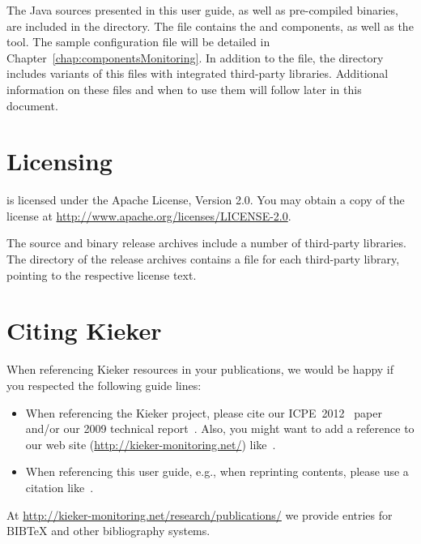 		\noindent
		The Java sources presented in this user guide, as well as pre-compiled binaries, are included in the \file{\exampleDir/} directory. The file \file{\mainJar{}} contains the \KiekerMonitoringPart{} and \KiekerAnalysisPart{} components, as well as the \KiekerTraceAnalysis{} tool. The sample \KiekerMonitoringPart{} configuration file 
		\file{\kiekerMonitoringProperties{}} will be detailed in Chapter~\ref{chap:componentsMonitoring}. In addition to the \file{\mainJar{}} file, the  directory includes variants of this  files with integrated third-party libraries. Additional information on these  files and when to use them will follow later in this document.
		
	\section{Licensing}
		\Kieker{} is licensed under the Apache License, Version 2.0. You may obtain a copy of the license at \url{http://www.apache.org/licenses/LICENSE-2.0}.
		
		The \Kieker{} source and binary release archives include a number of third-party libraries. The  directory of the release archives contains a  file for each third-party library, pointing to the respective license text.	
		
	\section{Citing Kieker}\label{sec:ch1:citingKieker}
		When referencing Kieker resources in your publications, we would be happy if you respected the following guide lines:

		\begin{itemize}
			\item 
			When referencing the Kieker project, please cite our ICPE~2012~\cite{KiekerICPE2012} paper and/or our 2009 technical report~\cite{vanHoornRohrHasselbringWallerEhlersFreyKieselhorst2009TRContinuousMonitoringOfSoftwareServicesDesignAndApplicationOfTheKiekerFramework}. Also, you might want to add a reference to our web site (\url{http://kieker-monitoring.net/}) like~\cite{KiekerWebSite}. 
			\item 
			When referencing this user guide, e.g., when reprinting contents, please use a citation like~\cite{Kieker1.7UserGuide}.
		\end{itemize}

		\noindent At \url{http://kieker-monitoring.net/research/publications/} we provide entries for $\mathrm{B\scriptstyle IB}\!$\TeX{} and other bibliography systems.

